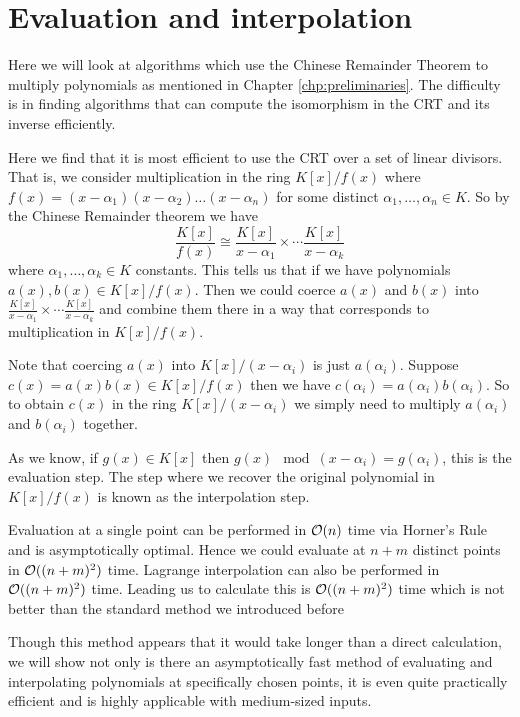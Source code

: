 \chapter{Evaluation and interpolation}\label{chp:eval-interp}

Here we will look at algorithms which use the Chinese Remainder Theorem to multiply polynomials as mentioned in Chapter \ref{chp:preliminaries}. The difficulty is in finding algorithms that can compute the isomorphism in the CRT and its inverse efficiently.

Here we find that it is most efficient to use the CRT over a set of linear divisors. That is, we consider multiplication in the ring $K[x] / f(x)$ where $f(x) = (x - \alpha_1)(x - \alpha_2) \ldots (x - \alpha_n)$ for some distinct $\alpha_1, \ldots, \alpha_n \in K$. So by the Chinese Remainder theorem we have
\[
    \frac{K[x]}{f(x)} \cong \frac{K[x]}{x - \alpha_1} \times \cdots \frac{K[x]}{x - \alpha_k}
\]
where $\alpha_1, \ldots, \alpha_k \in K$ constants. This tells us that if we have polynomials $a(x), b(x) \in K[x] / f(x)$. Then we could coerce $a(x)$ and $b(x)$ into $\frac{K[x]}{x - \alpha_1} \times \cdots \frac{K[x]}{x - \alpha_k}$ and combine them there in a way that corresponds to multiplication in $K[x] / f(x)$. 

Note that coercing $a(x)$ into $K[x] / (x - \alpha_i)$ is just $a(\alpha_i)$. Suppose $c(x) = a(x)b(x) \in K[x] / f(x)$ then we have $c(\alpha_i) = a(\alpha_i)b(\alpha_i)$. So to obtain $c(x)$ in the ring $K[x] / (x - \alpha_i)$ we simply need to multiply $a(\alpha_i)$ and $b(\alpha_i)$ together.

As we know, if $g(x) \in K[x]$ then $g(x) \mod (x - \alpha_i) = g(\alpha_i)$, this is the evaluation step. The step where we recover the original polynomial in $K[x]/f(x)$ is known as the interpolation step.

Evaluation at a single point can be performed in $\mathcal O(n)$ time via Horner's Rule and is asymptotically optimal. Hence we could evaluate at $n + m$ distinct points in $\mathcal O((n + m)^2)$ time. Lagrange interpolation can also be performed in $\mathcal O((n+m)^2)$ time. Leading us to calculate this is $\mathcal O((n + m)^2)$ time which is not better than the standard method we introduced before

Though this method appears that it would take longer than a direct calculation, we will show not only is there an asymptotically fast method of evaluating and interpolating polynomials at specifically chosen points, it is even quite practically efficient and is highly applicable with medium-sized inputs.

